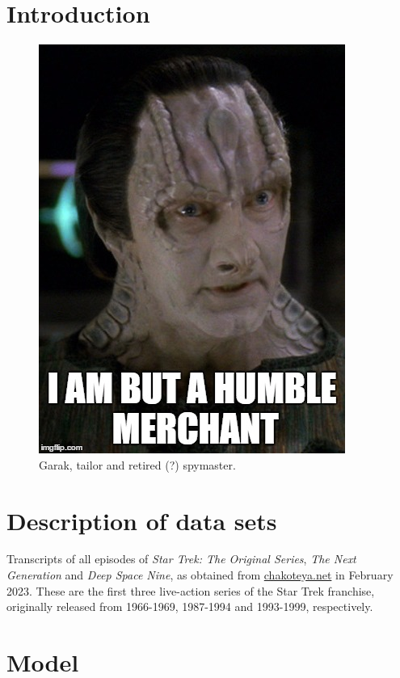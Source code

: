 

\section{Introduction}
\label{sec:papertag.introduction}

\begin{figure}[tp!]
  \centering	
    \includegraphics[width=0.5\columnwidth]{figures/localized/Garak.jpg}  
  \caption{
    Garak, tailor and retired (?) spymaster.
  }
  \label{fig:papertag.}
\end{figure}

\section{Description of data sets}
\label{sec:papertag.data}

Transcripts of all episodes of \textit{Star Trek: The Original Series}, \textit{The Next Generation} and \textit{Deep Space Nine}, as obtained from \href{http://chakoteya.net/StarTrek/index.html}{chakoteya.net} in February 2023. These are the first three live-action series of the Star Trek franchise, originally released from 1966-1969, 1987-1994 and 1993-1999, respectively.

\section{Model}
\label{sec:papertag.model}

